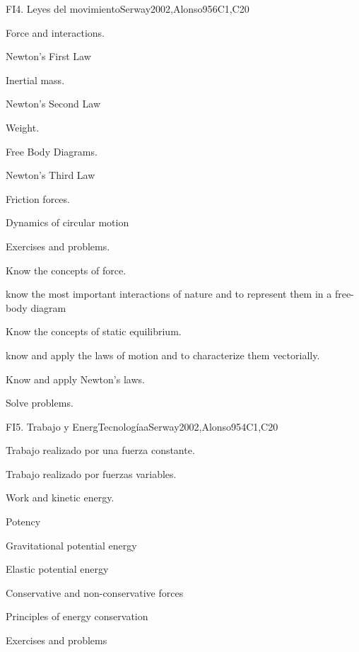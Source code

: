 \begin{syllabus}
\begin{unit}{FI4. Leyes del movimiento}{}{Serway2002,Alonso95}{6}{C1,C20}
\begin{topics}
      \item Force and interactions.
      \item Newton's First Law
      \item Inertial mass.
      \item Newton's Second Law
      \item Weight.
      \item Free Body Diagrams.
      \item Newton's Third Law
      \item Friction forces.
      \item Dynamics of circular motion
      \item Exercises and problems.
   \end{topics}

   \begin{learningoutcomes}
      \item Know the concepts of force.
      \item know the most important interactions of nature and to represent them in a free-body diagram
      \item Know the concepts of static equilibrium.
      \item know and apply the laws of motion and to characterize them vectorially.
      \item Know and apply Newton's laws.
      \item Solve problems.
   \end{learningoutcomes}
\end{unit}

\begin{unit}{FI5. Trabajo y EnergTecnologíaa}{}{Serway2002,Alonso95}{4}{C1,C20}
\begin{topics}
	\item Trabajo realizado por una fuerza constante.
	\item Trabajo realizado por fuerzas variables.
	\item Work and kinetic energy.
	\item Potency
	\item Gravitational potential energy
	\item Elastic potential energy
	\item Conservative and non-conservative forces
	\item Principles of energy conservation
	\item Exercises and problems
\end{topics}


\end{unit}
\end{syllabus}
